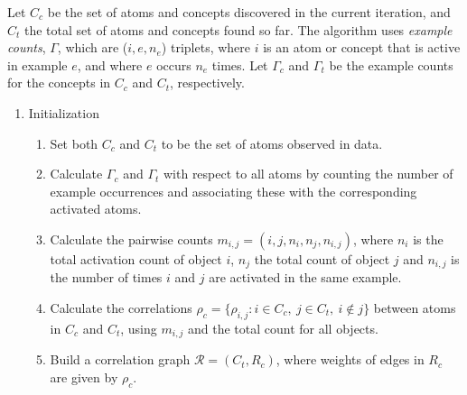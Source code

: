 \documentclass[conference]{IEEEtran}
\newcommand{\rn}[1]{\rho_{#1}}
\begin{document}
Let $C_c$ be the set of atoms and concepts discovered in the current iteration, and $C_t$ the total set of atoms and concepts found so far. 
The algorithm uses \emph{example counts}, $\Gamma$, which are ($i, e, n_e$) triplets, where $i$ is an atom or concept that is active in example $e$, and
where $e$ occurs $n_e$ times. Let $\Gamma_c$ and $\Gamma_t$ be the example counts for the concepts in $C_c$ and $C_t$, respectively. 

\begin{enumerate}

\item Initialization

\begin{enumerate}
\item
Set both $C_c$ and $C_t$ to be the set of atoms observed in data. 
\item 
Calculate $\Gamma_c$ and $\Gamma_t$ with respect to all atoms by counting the number of example occurrences and associating
these with the corresponding activated atoms.
\item
Calculate the pairwise counts $m_{i,j} = (i, j, n_i, n_j, n_{i,j})$, where $n_i$ is the total activation count of object $i$, $n_j$ the total count of object $j$
and $n_{i,j}$ is the number of times $i$ and $j$ are activated in the same example.
\item
Calculate the correlations $\rho_c  = \{\rn{i,j}: i \in C_c,\ j \in C_t,\ i \not \in j\}$ 
between atoms in $C_c$ and $C_t$, using $m_{i,j}$ and the total count for all objects.
\item
Build a correlation graph $\mathcal{R} = (C_t, R_c)$, where weights of edges in $R_c$ are given by $\rho_c$.

\end{enumerate}


\end{enumerate}
\end{document}
